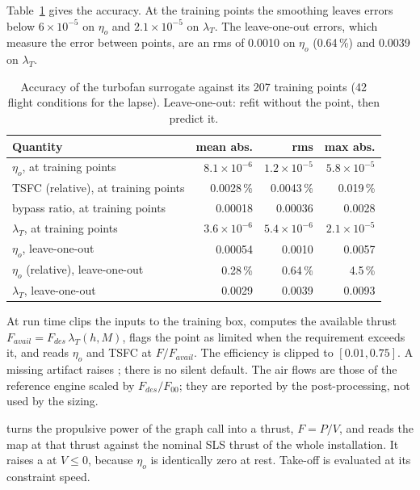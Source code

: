 \documentclass[a4paper,11pt]{article}
\newcommand{\etao}{\eta_{o}}
\begin{document}
Table~\ref{tab:tf-fit} gives the accuracy. At the training points the smoothing leaves errors
below $6\times10^{-5}$ on $\etao$ and $2.1\times10^{-5}$ on $\lambda_T$. The leave-one-out
errors, which measure the error between points, are an rms of 0.0010 on $\etao$ (0.64\,\%) and
0.0039 on $\lambda_T$.

\begin{table}[htbp]
\centering\small
\caption{Accuracy of the turbofan surrogate against its 207 training points (42 flight
conditions for the lapse). Leave-one-out: refit without the point, then predict it.}\label{tab:tf-fit}
\begin{tabular}{@{}lrrr@{}}
\toprule
Quantity & mean abs. & rms & max abs. \\
\midrule
$\etao$, at training points & $8.1\times10^{-6}$ & $1.2\times10^{-5}$ & $5.8\times10^{-5}$ \\
TSFC (relative), at training points & 0.0028\,\% & 0.0043\,\% & 0.019\,\% \\
bypass ratio, at training points & 0.00018 & 0.00036 & 0.0028 \\
$\lambda_T$, at training points & $3.6\times10^{-6}$ & $5.4\times10^{-6}$ & $2.1\times10^{-5}$ \\
$\etao$, leave-one-out & 0.00054 & 0.0010 & 0.0057 \\
$\etao$ (relative), leave-one-out & 0.28\,\% & 0.64\,\% & 4.5\,\% \\
$\lambda_T$, leave-one-out & 0.0029 & 0.0039 & 0.0093 \\
\bottomrule
\end{tabular}
\end{table}

At run time 
clips the inputs to the training box, computes the available thrust
$F_{avail} = F_{des}\,\lambda_T(h, M)$, flags the point as limited when the requirement exceeds
it, and reads $\etao$ and TSFC at $F/F_{avail}$. The efficiency is clipped to $[0.01, 0.75]$. A
missing artifact raises ; there is no silent default. The air flows are
those of the reference engine scaled by $F_{des}/F_{00}$; they are reported by the
post-processing, not used by the sizing.

 turns the propulsive power of the graph call into a
thrust, $F = P/V$, and reads the map at that thrust against the nominal SLS thrust of the whole
installation. It raises a  at $V \le 0$, because $\etao$ is identically zero at
rest. Take-off is evaluated at its constraint speed.
\end{document}
